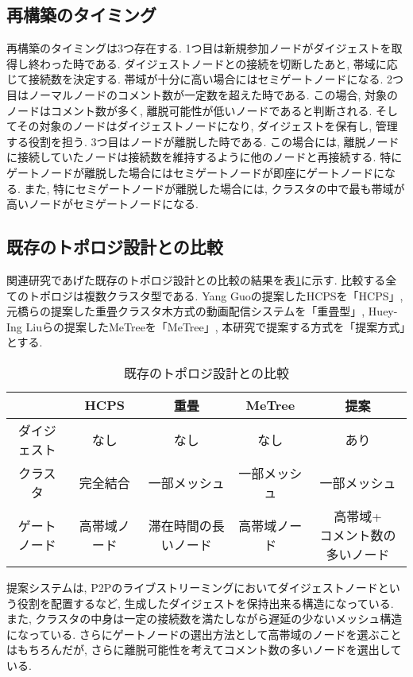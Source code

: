 \newpage

\subsection{再構築のタイミング}
再構築のタイミングは3つ存在する. 1つ目は新規参加ノードがダイジェストを取得し終わった時である. ダイジェストノードとの接続を切断したあと, 帯域に応じて接続数を決定する. 帯域が十分に高い場合にはセミゲートノードになる. 2つ目はノーマルノードのコメント数が一定数を超えた時である. この場合, 対象のノードはコメント数が多く, 離脱可能性が低いノードであると判断される. そしてその対象のノードはダイジェストノードになり, ダイジェストを保有し, 管理する役割を担う. 3つ目はノードが離脱した時である. この場合には, 離脱ノードに接続していたノードは接続数を維持するように他のノードと再接続する. 特にゲートノードが離脱した場合にはセミゲートノードが即座にゲートノードになる. また, 特にセミゲートノードが離脱した場合には, クラスタの中で最も帯域が高いノードがセミゲートノードになる.

\newpage

\subsection{既存のトポロジ設計との比較}
関連研究であげた既存のトポロジ設計との比較の結果を表\ref{tbl:compare-topology}に示す. 比較する全てのトポロジは複数クラスタ型である. Yang Guoの提案したHCPSを「HCPS」, 元橋らの提案した重畳クラスタ木方式の動画配信システムを「重畳型」, Huey-Ing Liuらの提案したMeTreeを「MeTree」, 本研究で提案する方式を「提案方式」とする.

\begin{table}[h]
  \caption{既存のトポロジ設計との比較}
  \label{tbl:compare-topology}
  \centering
      {\small
        \begin{tabular}{|c|c|c|c|c|} \hline
          & HCPS & 重畳 & MeTree & 提案 \\ \hline \hline
          ダイジェスト & なし & なし & なし & あり \\ \hline
          クラスタ & 完全結合 & 一部メッシュ & 一部メッシュ  & 一部メッシュ \\
          \hline
          ゲートノード & 高帯域ノード & 滞在時間の長いノード & 高帯域ノード & \shortstack{高帯域+ \\ コメント数の多いノード} \\
          \hline
        \end{tabular}
      }
\end{table}

提案システムは, P2Pのライブストリーミングにおいてダイジェストノードという役割を配置するなど, 生成したダイジェストを保持出来る構造になっている. また, クラスタの中身は一定の接続数を満たしながら遅延の少ないメッシュ構造になっている. さらにゲートノードの選出方法として高帯域のノードを選ぶことはもちろんだが, さらに離脱可能性を考えてコメント数の多いノードを選出している.

